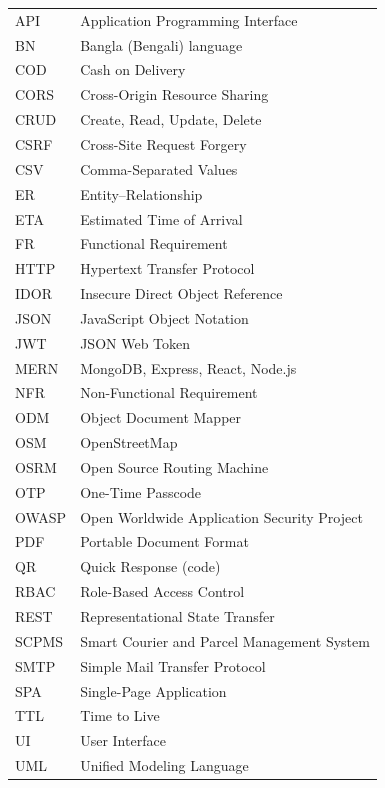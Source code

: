 \begin{longtable}{@{}p{3.0cm}p{11.0cm}@{}}
API    & Application Programming Interface \\
BN     & Bangla (Bengali) language \\
COD    & Cash on Delivery \\
CORS   & Cross-Origin Resource Sharing \\
CRUD   & Create, Read, Update, Delete \\
CSRF   & Cross-Site Request Forgery \\
CSV    & Comma-Separated Values \\
ER     & Entity--Relationship \\
ETA    & Estimated Time of Arrival \\
FR     & Functional Requirement \\
HTTP   & Hypertext Transfer Protocol \\
IDOR   & Insecure Direct Object Reference \\
JSON   & JavaScript Object Notation \\
JWT    & JSON Web Token \\
MERN   & MongoDB, Express, React, Node.js \\
NFR    & Non-Functional Requirement \\
ODM    & Object Document Mapper \\
OSM    & OpenStreetMap \\
OSRM   & Open Source Routing Machine \\
OTP    & One-Time Passcode \\
OWASP  & Open Worldwide Application Security Project \\
PDF    & Portable Document Format \\
QR     & Quick Response (code) \\
RBAC   & Role-Based Access Control \\
REST   & Representational State Transfer \\
SCPMS  & Smart Courier and Parcel Management System \\
SMTP   & Simple Mail Transfer Protocol \\
SPA    & Single-Page Application \\
TTL    & Time to Live \\
UI     & User Interface \\
UML    & Unified Modeling Language \\
\end{longtable}
